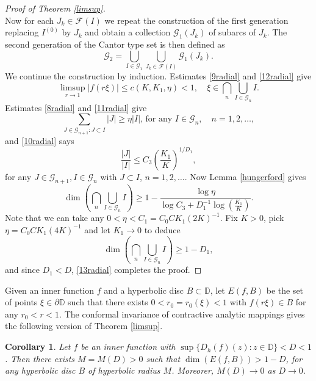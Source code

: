 \documentclass[a4paper,12pt]{article}
\newtheorem{cor}{Corollary}[section]
\theoremstyle{definition}
\numberwithin{equation}{section}
\newcommand{\D}{\mathbb D}
\begin{document}
\begin{proof}[Proof of Theorem \ref{limsup}]
\begin{equation}
\end{equation}
Now for each $J_{k} \in \mathcal{F}(I)$ we repeat the construction of the first generation replacing $I^{(0)}$ by $J_{k}$ and obtain a collection $\mathcal{G}_{1}\left(J_{k}\right)$ of subarcs of $J_{k}$. The second generation of the Cantor type set is then defined as
$$
\mathcal{G}_{2}=\bigcup_{I \in \mathcal{G}_{1}} \bigcup_{J_{k} \in \mathcal{F}(I)} \mathcal{G}_{1}\left(J_{k}\right) . 
$$
We continue the construction by induction. Estimates \eqref{9radial} and \eqref{12radial} give
\begin{equation}
\label{13radial}
    \limsup _{r \rightarrow 1}|f(r \xi)| \leq c\left(K, K_{1}, \eta \right)<1, \quad \xi\in \bigcap_{n} \bigcup_{I \in \mathcal{G}_{n}} I . 
\end{equation}
Estimates \eqref{8radial} and \eqref{11radial} give
$$
\sum_{J \in \mathcal{G}_{n+1}: J \subset I}|J| \geqslant \eta |I| \text {, for any } I \in \mathcal{G}_{n}, \quad n=1,2,\ldots , 
$$
and \eqref{10radial} says
$$
\frac{|J|}{|I|} \leq C_{3}\left(\frac{K_{1}}{K}\right)^{1 / D_{1}},
$$
for any $J \in \mathcal{G}_{n+1}, I \in \mathcal{G}_{n}$ with $J \subset I$, $n=1,2,\ldots$. Now Lemma \ref{hungerford} gives
$$
\operatorname{dim} \left(\bigcap_{n} \bigcup_{I \in \mathcal{G}_{n}} I \right) \geqslant 1-\frac{\log \eta}{\log C_{3}+ D_{1}^{-1} \log \left(\frac{K_{1}}{K}\right)} . 
$$
Note that we can take any $0<\eta <C_1= C_0 C K_{1} (2  K)^{-1}$. Fix $K>0$, pick $\eta= C_0 C K_1 (4  K)^{-1}$ and let $K_1 \to 0$ to deduce 
$$
\operatorname{dim} \left(\bigcap_{n} \bigcup_{I \in \mathcal{G}_{n}} I\right) \geqslant 1-D_1 , 
$$
and since $D_1 < D$, \eqref{13radial} completes the proof.

\end{proof}

Given an inner function $f$ and a hyperbolic disc $B \subset \D$, let $E(f, B)$ be the set of points $\xi \in \partial \D$ such that there exists $0< r_0 = r_0 (\xi) < 1$ with $f(r \xi ) \in B$ for any $r_0 < r < 1$. The conformal invariance of contractive analytic mappings gives the following version of Theorem \ref{limsup}.

\begin{cor}
Let $f$ be an inner function  with $\sup \{D_h (f) (z) : z \in \D\}<D<1$. 
Then there exists $M=M(D)>0$ such that $\operatorname{dim}  ( E(f, B) ) > 1- D$, for any hyperbolic disc $B$ of hyperbolic radius $M$. Moreorer, $M(D) \rightarrow 0$ as $D \rightarrow 0$.

    
\end{cor}
\end{document}
